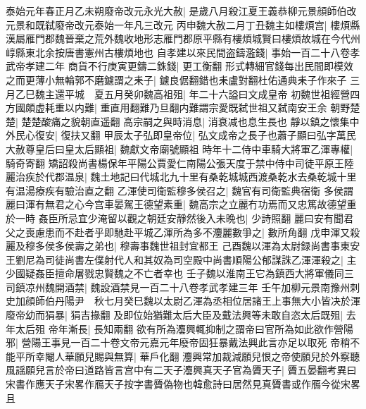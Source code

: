 泰始元年春正月乙未朔廢帝改元永光大赦|{
	是歲八月殺江夏王義恭柳元景顔師伯改元景和既弑廢帝改元泰始一年凡三改元}
丙申魏大赦二月丁丑魏主如樓煩宫|{
	樓煩縣漢屬雁門郡魏晉棄之荒外魏收地形志雁門郡原平縣有樓煩城賢曰樓煩故城在今代州崞縣東北余按唐書憲州古樓煩地也}
自孝建以來民間盗鑄濫錢|{
	事始一百二十八卷孝武帝孝建二年}
商貨不行庚寅更鑄二銖錢|{
	更工衡翻}
形式轉細官錢每出民間即模效之而更薄小無輪郭不磨鑢謂之耒子|{
	鑢良倨翻錯也耒盧對翻杜佑通典耒子作來子}
三月乙巳魏主還平城　夏五月癸卯魏高祖殂|{
	年二十六謚曰文成皇帝}
初魏世祖經營四方國頗虚耗重以内難|{
	重直用翻難乃旦翻内難謂宗愛既弑世祖又弑南安王余}
朝野楚楚|{
	楚楚酸痛之貌朝直遥翻}
高宗嗣之與時消息|{
	消衰减也息生長也}
靜以鎮之懷集中外民心復安|{
	復扶又翻}
甲辰太子弘即皇帝位|{
	弘文成帝之長子也蕭子顯曰弘字萬民}
大赦尊皇后曰皇太后顯祖|{
	魏獻文帝廟號顯祖}
時年十二侍中車騎大將軍乙渾專權|{
	騎奇寄翻}
矯詔殺尚書楊保年平陽公賈愛仁南陽公張天度于禁中侍中司徒平原王陸麗治疾於代郡温泉|{
	魏土地記曰代城北九十里有桑乾城城西渡桑乾水去桑乾城十里有温湯療疾有驗治直之翻}
乙渾使司衛監穆多侯召之|{
	魏官有司衛監典宿衛}
多侯謂麗曰渾有無君之心今宫車晏駕王德望素重|{
	魏高宗之立麗冇功焉而又忠篤故德望重於一時}
姦臣所忌宜少淹留以觀之朝廷安靜然後入未晩也|{
	少詩照翻}
麗曰安有聞君父之喪慮患而不赴者乎即馳赴平城乙渾所為多不灋麗數爭之|{
	數所角翻}
戊申渾又殺麗及穆多侯多侯壽之弟也|{
	穆壽事魏世祖封宜都王}
己酉魏以渾為太尉録尚書事東安王劉尼為司徒尚書左僕射代人和其奴為司空殿中尚書順陽公郁謀誅乙渾渾殺之|{
	主少國疑姦臣擅命屠戮忠賢魏之不亡者幸也}
壬子魏以淮南王它為鎮西大將軍儀同三司鎮凉州魏開酒禁|{
	魏設酒禁見一百二十八卷孝武孝建三年}
壬午加柳元景南豫州刺史加顔師伯丹陽尹　秋七月癸巳魏以太尉乙渾為丞相位居諸王上事無大小皆决於渾　廢帝幼而狷暴|{
	狷吉掾翻}
及即位始猶難太后大臣及戴法興等未敢自恣太后既殂|{
	去年太后殂}
帝年漸長|{
	長知兩翻}
欲有所為灋興輒抑制之謂帝曰官所為如此欲作營陽邪|{
	營陽王事見一百二十卷文帝元嘉元年廢帝固狂暴戴法興此言亦足以取死}
帝稍不能平所幸閹人華願兒賜與無算|{
	華戶化翻}
灋興常加裁減願兒恨之帝使願兒於外察聽風謡願兒言於帝曰道路皆言宫中有二天子灋興真天子官為贗天子|{
	贗五晏翻考異曰宋書作應天子宋畧作鴈天子按字書贗偽物也韓愈詩曰居然見真贗書或作鴈今從宋畧}
且

